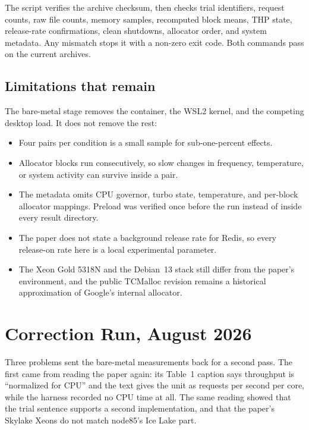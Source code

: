 \documentclass[a4paper,11pt]{article}
\begin{document}
The script verifies the archive checksum, then checks trial identifiers, request
counts, raw file counts, memory samples, recomputed block means, THP state,
release-rate confirmations, clean shutdowns, allocator order, and system
metadata. Any mismatch stops it with a non-zero exit code. Both commands pass on
the current archives.

\subsection{Limitations that remain}

The bare-metal stage removes the container, the WSL2 kernel, and the competing
desktop load. It does not remove the rest:

\begin{itemize}[leftmargin=1.5em]
  \item Four pairs per condition is a small sample for sub-one-percent effects.
  \item Allocator blocks run consecutively, so slow changes in frequency,
  temperature, or system activity can survive inside a pair.
  \item The metadata omits CPU governor, turbo state, temperature, and per-block
  allocator mappings. Preload was verified once before the run instead of inside
  every result directory.
  \item The paper does not state a background release rate for Redis, so every
  release-on rate here is a local experimental parameter.
  \item The Xeon Gold 5318N and the Debian~13 stack still differ from the
  paper's environment, and the public TCMalloc revision remains a historical
  approximation of Google's internal allocator.
\end{itemize}

\section{Correction Run, August 2026}
\label{sec:correction-run}

Three problems sent the bare-metal measurements back for a second pass. The
first came from reading the paper again: its Table~1 caption says throughput is
``normalized for CPU'' and the text gives the unit as requests per second per
core, while the harness recorded no CPU time at all. The same reading showed
that the trial sentence supports a second implementation, and that the paper's
Skylake Xeons do not match node85's Ice Lake part.
\end{document}
